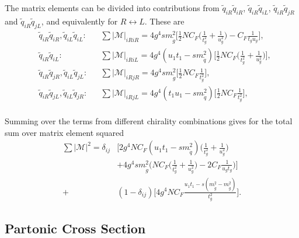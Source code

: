 \documentclass[twoside,english]{uiofysmaster}
\begin{document}
{The matrix elements can be divided into contributions from $\widetilde{q}_{iR} \widetilde{q}_{iR}$, $\widetilde{q}_{iR} \widetilde{q}_{iL}$, $\widetilde{q}_{iR} \widetilde{q}_{jR}$ and $\widetilde{q}_{iR} \widetilde{q}_{jL}$, and equivalently for $R \leftrightarrow L$. These are
\begin{align}
&\widetilde{q}_{iR} \widetilde{q}_{iR}, \widetilde{q}_{iL} \widetilde{q}_{iL}: && \sum |\mathcal{M}|_{iRiR} = 4g^4 s m_{\widetilde{g}}^2 \Big[ \frac{1}{2} NC_F\Big( \frac{1}{t_g^2} + \frac{1}{u_g^2} \Big) - C_F \frac{1}{t_gu_g} \Big],\\
&\widetilde{q}_{iR} \widetilde{q}_{iL}: &&\sum |\mathcal{M}|_{iRiL}=  4 g^4 (u_1t_1 - sm_{\widetilde{q}}^2) \Big[ \frac{1}{2}NC_F \Big( \frac{1}{t_g^2} + \frac{1}{u_g^2} \Big) \Big],\\
& \widetilde{q}_{iR} \widetilde{q}_{jR}, \widetilde{q}_{iL} \widetilde{q}_{jL}: && \sum |\mathcal{M}|_{iRjR} = 4 g^4 sm_{\widetilde{g}}^2 \Big[\frac{1}{2} NC_F \frac{1}{t_g^2}  \Big],\\
& \widetilde{q}_{iR} \widetilde{q}_{jL}, \widetilde{q}_{iL} \widetilde{q}_{jR}: && \sum |\mathcal{M}|_{iRjL} = 4 g^4 (t_1u_1 - sm_{\widetilde{q}}^2) \Big[\frac{1}{2} NC_F \frac{1}{t_g^2}  \Big],\\
\end{align}

Summing over the terms from different chirality combinations gives  for the total sum over matrix element squared 
\begin{align}
\sum |\mathcal{M}|^2 = \delta_{ij} & \Bigg[2 g^4NC_F(u_1t_1-sm_{\widetilde{q}}^2) \Big( \frac{1}{t_g^2} + \frac{1}{u_g^2} \Big) \nonumber \\& + 4 g^4 sm_{\widetilde{g}}^2 \Big( NC_F \Big(\frac{1}{t_g^2} + \frac{1}{u_g^2}\Big) -2C_F\frac{1}{u_gt_g} \Big) \Bigg] \nonumber \\
+& (1-\delta_{ij})\Bigg[4g^4NC_F  \frac{u_1t_1-s(m_{\widetilde{g}}^2-m_{\widetilde{g}}^2)}{t_g^2} \Bigg].
\end{align}



\subsection*{Partonic Cross Section}

}
\end{document}
